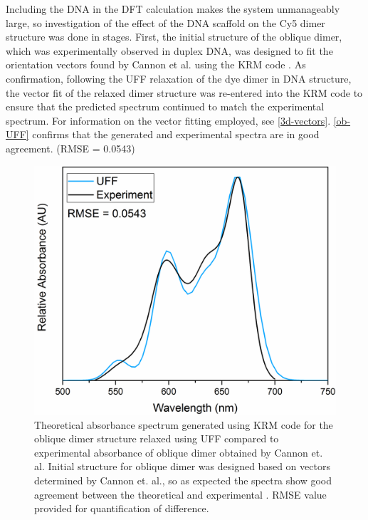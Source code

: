 Including the DNA in the DFT calculation makes the system unmanageably large, so investigation of the effect of the DNA scaffold on the Cy5 dimer structure was done in stages. First, the initial structure of the oblique dimer, which was experimentally observed in duplex DNA, was designed to fit the orientation vectors found by Cannon et al. using the KRM code \cite{Cannon2017}. As confirmation, following the UFF relaxation of the dye dimer in DNA structure, the vector fit of the relaxed dimer structure was re-entered into the KRM code to ensure that the predicted spectrum continued to match the experimental spectrum. For information on the vector fitting employed, see \autoref{3d-vectors}. \autoref{ob-UFF} confirms that the generated and experimental spectra are in good agreement. (RMSE = 0.0543)
\begin{figure}[h!]
    \centering
    \includegraphics[width=0.8\linewidth]{figures/pub1/ob-dimerUFF.pdf}
    \caption[Theoretical absorbance spectrum generated using KRM code for the oblique dimer structure relaxed using UFF compared to experimental absorbance of oblique dimer obtained by Cannon et. al. Initial structure for oblique dimer was designed based on vectors determined by Cannon et. al., so as expected the spectra show good agreement between the theoretical and experimental. RMSE value provided for quantification of difference.]{Theoretical absorbance spectrum generated using KRM code for the oblique dimer structure relaxed using UFF compared to experimental absorbance of oblique dimer obtained by Cannon et. al. Initial structure for oblique dimer was designed based on vectors determined by Cannon et. al., so as expected the spectra show good agreement between the theoretical and experimental \cite{Cannon2017}. RMSE value provided for quantification of difference.}\label{ob-UFF}
\end{figure}

